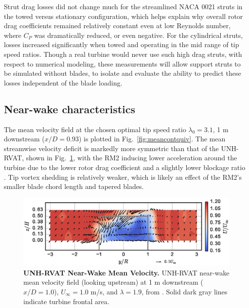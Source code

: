 \documentclass[10pt,letterpaper]{article}
\begin{document}
Strut drag losses did not change much for the streamlined NACA 0021 struts in
the towed versus stationary configuration, which helps explain why overall rotor
drag coefficients remained relatively constant even at low Reynolds number,
where $C_P$ was dramatically reduced, or even negative. For the cylindrical
struts, losses increased significantly when towed and operating in the mid range
of tip speed ratios. Though a real turbine would never use such high drag
struts, with respect to numerical modeling, these measurements will allow
support struts to be simulated without blades, to isolate and evaluate the
ability to predict these losses independent of the blade loading.


\subsection*{Near-wake characteristics}

The mean velocity field at the chosen optimal tip speed ratio $\lambda_0=3.1$, 1
m downstream ($x/D=0.93$) is plotted in Fig.~\ref{fig:meancontquiv}. The mean
streamwise velocity deficit is markedly more symmetric than that of the
UNH-RVAT, shown in Fig.~\ref{fig:rvat-meancontquiv}, with the RM2 inducing lower
acceleration around the turbine due to the lower rotor drag coefficient and a
slightly lower blockage ratio \cite{Bachant2015-JoT}. Tip vortex shedding is
relatively weaker, which is likely an effect of the RM2's smaller blade chord
length and tapered blades.

\begin{figure}
    \includegraphics[width=\textwidth]{figures/RVAT-Re-dep-meancontquiv_10.eps}
    
    \caption{{\bf UNH-RVAT Near-Wake Mean Velocity.} UNH-RVAT near-wake mean
        velocity field (looking upstream) at 1 m downstream ($x/D=1.0$),
        $U_\infty=1.0$ m/s, and $\lambda=1.9$, from \cite{Bachant2016-Energies}.
        Solid dark gray lines indicate turbine frontal area.}
    
    \label{fig:rvat-meancontquiv}
\end{figure}
\end{document}
